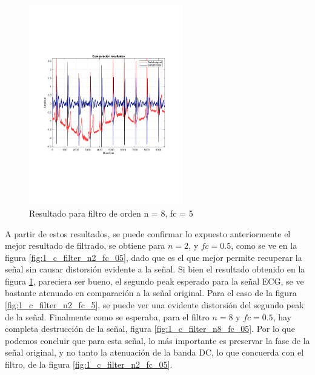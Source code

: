 		\begin{figure}[H]
			\center
			\includegraphics[width=0.6\textwidth,clip, trim = {1.9cm 6.8cm 2.3cm 7cm}]{../plots/1_c_ecg_filtered_8_freq_5.pdf}
			\caption{Resultado para filtro de orden n = 8, fc = 5}
			\label{fig:1_c_filter_n8_fc_5}
		\end{figure}
		
		A partir de estos resultados, se puede confirmar lo expuesto anteriormente el mejor resultado de filtrado, se obtiene para $n= 2$, y $fc = 0.5$, como se ve en la figura \ref{fig:1_c_filter_n2_fc_05}, dado que es el que mejor permite recuperar la señal sin causar distorsión evidente a la señal. Si bien el resultado obtenido en la figura \ref{fig:1_c_filter_n8_fc_5}, pareciera ser bueno, el segundo peak esperado para la señal ECG, se ve bastante atenuado en comparación a la señal original. Para el caso de la figura \ref{fig:1_c_filter_n2_fc_5}, se puede ver una evidente distorsión del segundo peak de la señal. Finalmente como se esperaba, para el filtro $n=8$ y $fc = 0.5$, hay completa destrucción de la señal, figura \ref{fig:1_c_filter_n8_fc_05}. Por lo que podemos concluir que para esta señal, lo más importante es preservar la fase de la señal original, y no tanto la atenuación de la banda DC, lo que concuerda con el filtro, de la figura \ref{fig:1_c_filter_n2_fc_05}. 